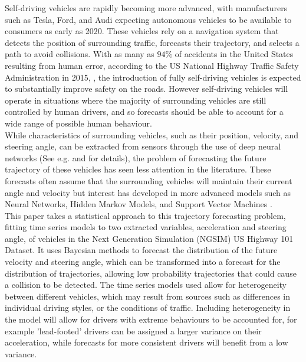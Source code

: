 \documentclass[
12pt, %
onehalfspacing, %
nohyperref, %
headsepline, %
chapterinoneline, %
]{MastersDoctoralThesis} %
\begin{document}
Self-driving vehicles are rapidly becoming more advanced, with manufacturers such as Tesla, Ford, and Audi expecting autonomous vehicles to be available to consumers as early as 2020. These vehicles rely on a navigation system that detects the position of surrounding traffic, forecasts their trajectory, and selects a path to avoid collisions. With as many as $94\%$ of accidents in the United States resulting from human error, according to the US National Highway Traffic Safety Administration in 2015, \citep{NHTSA2015}, the introduction of fully self-driving vehicles is expected to substantially improve safety on the roads. However self-driving vehicles will operate in situations where the majority of surrounding vehicles are still controlled by human drivers, and so forecasts should be able to account for a wide range of possible human behaviour.
\\

While characteristics of surrounding vehicles, such as their position, velocity, and steering angle, can be extracted from sensors through the use of deep neural networks (See e.g. \citet{Woo2016a} and \citet{Tian2017} for details), the problem of forecasting the future trajectory of these vehicles has seen less attention in the literature. These forecasts often assume that the surrounding vehicles will maintain their current angle and velocity \citep{Gindele2010, Houenou2013, Bautista2017, Waymo2017} but interest has developed in more advanced models such as Neural Networks, Hidden Markov Models, and Support Vector Machines \citep{Ding2013, Woo2016b, Geng2017, Woo2017, Zheng2017}.
\\

This paper takes a statistical approach to this trajectory forecasting problem, fitting time series models to two extracted variables, acceleration and steering angle, of vehicles in the Next Generation Simulation (NGSIM) US Highway 101 Dataset. It uses Bayesian methods to forecast the distribution of the future velocity and steering angle, which can be transformed into a forecast for the distribution of trajectories, allowing low probability trajectories that could cause a collision to be detected. The time series models used allow for heterogeneity between different vehicles, which may result from sources such as differences in individual driving styles, or the conditions of traffic. Including heterogeneity in the model will allow for drivers with extreme behaviours to be accounted for, for example 'lead-footed' drivers can be assigned a larger variance on their acceleration, while forecasts for more consistent drivers will benefit from a low variance.
\\
\end{document}
